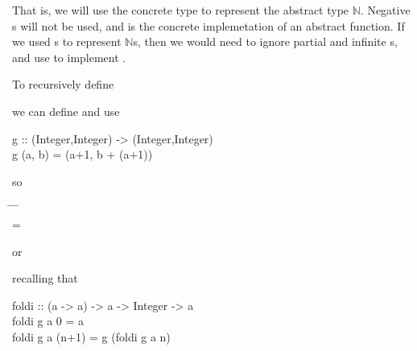 \documentclass{seminar}
\newcommand{\NAT}{\textcolor{MathColor}{\ensuremath{\mathbb{N}}}}
\begin{document}
\begin{slide}
That is, we will use the concrete type  to represent the
abstract type \NAT.  Negative s will not be used, and
 is the concrete implemetation of an abstract
\tmtt{fold\NAT} function.  If we used s to represent \NAT s,
then we would need to ignore partial and infinite s, and use
 to implement \tmtt{fold\NAT}.

\newpage

To recursively define

\begin{codenott}
\end{codenott}

we can define and use 

\begin{code}
g :: (Integer,Integer) -> (Integer,Integer)\\
g (a, b) = (a+1, b + (a+1))
\end{code}

so

\begin{codenott}
 \= 
\=  \= \kill
{} \>  \> \\
 \> =  \> 
\> 
\end{codenott}

or

\begin{codenott}
 
\end{codenott}

recalling that

\begin{code}
foldi :: (a -> a) -> a -> Integer -> a\\
foldi g a 0 = a\\
foldi g a (n+1) = g (foldi g a n)
\end{code}

\newpage

% 
% 
% 
% 
% 
 

\end{slide}
\end{document}
